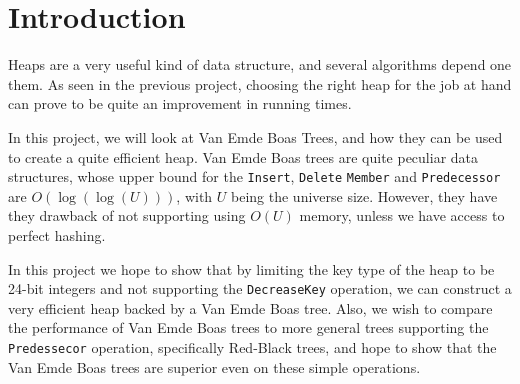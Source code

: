 \section{Introduction}

Heaps are a very useful kind of data structure, and several algorithms depend one them. As seen in the previous project, choosing the right heap for the job at hand can prove to be quite an improvement in running times.

In this project, we will look at Van Emde Boas Trees, and how they can be used to create a quite efficient heap. Van Emde Boas trees are quite peculiar data structures, whose upper bound for the \texttt{Insert}, \texttt{Delete} \texttt{Member} and \texttt{Predecessor} are $O(\log ( \log (U)))$, with $U$ being the universe size. However, they have they drawback of not supporting  using $O(U)$ memory, unless we have access to perfect hashing.

In this project we hope to show that by limiting the key type of the heap to be 24-bit integers and not supporting the \texttt{DecreaseKey} operation, we can construct a very efficient heap backed by a Van Emde Boas tree. Also, we wish to compare the performance of Van Emde Boas trees to more general trees supporting the \texttt{Predessecor} operation, specifically Red-Black trees, and hope to show that the Van Emde Boas trees are superior even on these simple operations.